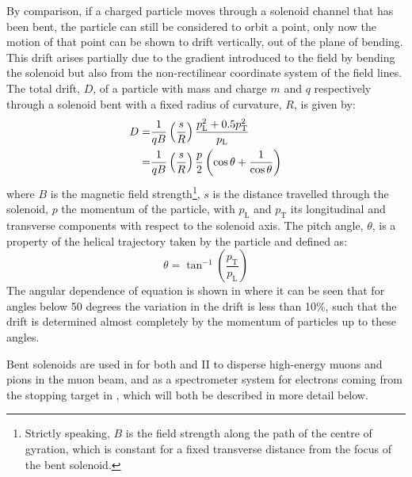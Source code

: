 By comparison, if a charged particle moves through a solenoid channel that has been bent, the particle can still be considered to orbit a point, only now 
the motion of that point can be shown to drift vertically, out of the plane of bending.
This drift arises partially due to the gradient introduced to the field by bending the solenoid but also from the 
non-rectilinear coordinate system of the field lines.  
The total drift, $D$, of a particle with mass and charge $m$ and $q$ respectively  through a solenoid bent with a fixed radius of curvature, $R$, is given by:
\begin{align}
	D=&\frac{1}{qB}\left(\frac{s}{R}\right)\frac{p^2_\mathrm{L}+0.5p^2_\mathrm{T}}{p_\mathrm{L}}\eqlabel{detector:bent-solenoids:longVstrans}\\
	 =&\frac{1}{qB}\left(\frac{s}{R}\right)\frac{p}{2}\left(\cos\theta + \frac{1}{\cos\theta}\right)\eqlabel{detector:bent-solenoids:pitchAngle}
\end{align}
where $B$ is the magnetic field strength\footnote{Strictly speaking, $B$ is the field strength along the path of the centre of gyration, which is constant for a fixed transverse distance from the focus of the bent solenoid.},
$s$ is the distance travelled through the solenoid, $p$ the momentum of the particle, with $p_\mathrm{L}$ and $p_\mathrm{T}$ its longitudinal and transverse components with respect to the solenoid axis.
The pitch angle, $\theta$, is a property of the helical trajectory taken by the particle and defined as:
\begin{equation}
\theta=\tan^{-1}\left(\frac{p_\mathrm{T}}{p_\mathrm{L}}\right)
\end{equation}
The angular dependence of equation  is shown in
 where it can be seen that for
angles below 50 degrees the variation in the drift is less than 10\%, such that
the drift is determined almost completely by the momentum of particles up to
these angles.

Bent solenoids are used in \COMET for both \phaseI and II to disperse high-energy muons and pions in the muon
beam, and as a spectrometer system for electrons coming
from the stopping target in \phaseII, which will both be described in more
detail below.

